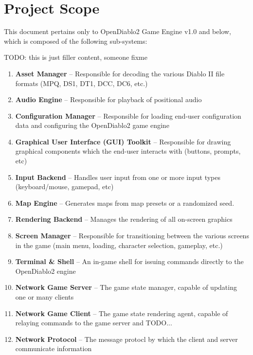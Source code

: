 \section{Project Scope} \label{sec:product_scope}


This document pertains only to OpenDiablo2 Game Engine v1.0 and below, which 
is composed of the following sub-systems:

TODO: this is just filler content, someone fixme
\begin{enumerate}
\item \textbf{Asset Manager} -- Responsible for decoding the various Diablo II file formats (MPQ, DS1, DT1, DCC, DC6, etc.)
\item \textbf{Audio Engine} -- Responsible for playback of positional audio
\item \textbf{Configuration Manager} -- Responsible for loading end-user configuration data and configuring the OpenDiablo2 game engine
\item \textbf{Graphical User Interface (GUI) Toolkit} -- Responsible for drawing graphical components which the end-user interacts with (buttons, prompts, etc)
\item \textbf{Input Backend} -- Handles user input from one or more input types (keyboard/mouse, gamepad, etc)
\item \textbf{Map Engine} -- Generates maps from map presets or a randomized seed.
\item \textbf{Rendering Backend} -- Manages the rendering of all on-screen graphics
\item \textbf{Screen Manager} -- Responsible for transitioning between the various screens in the game (main menu, loading, character selection, gameplay, etc.)
\item \textbf{Terminal \& Shell} -- An in-game shell for issuing commands directly to the OpenDiablo2 engine
\item \textbf{Network Game Server} -- The game state manager, capable of updating one or many clients
\item \textbf{Network Game Client} -- The game state rendering agent, capable of relaying commands to the game server and TODO...
\item \textbf{Network Protocol} -- The message protocl by which the client and server communicate information
\end{enumerate}
